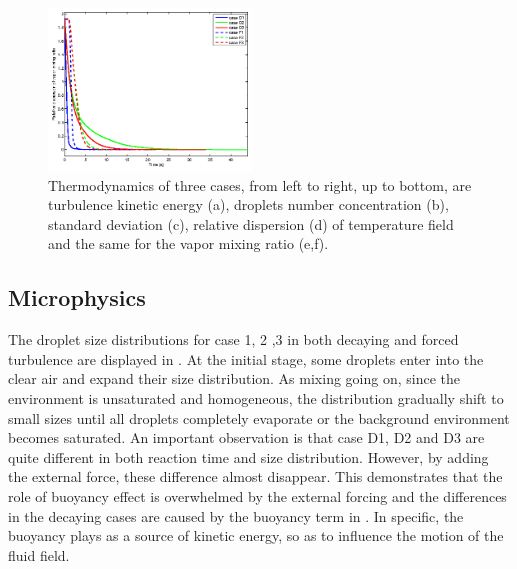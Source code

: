 \begin{figure}
\includegraphics[width=0.48\textwidth]{Figures/vapor_dsp}
\caption{Thermodynamics of three cases, from left to right, up to bottom, are
turbulence kinetic energy (a), droplets number concentration (b), standard
deviation (c), relative dispersion (d) of temperature field and the same for
the vapor mixing ratio (e,f).\label{fig:therm_dynam}} \end{figure}

\subsection{Microphysics}
The droplet size distributions for case 1, 2 ,3 in both decaying and forced
turbulence are displayed in . At the initial stage, some
droplets enter into the clear air and expand their size distribution. As mixing
going on, since the environment is unsaturated and homogeneous, the
distribution gradually shift to small sizes until all droplets completely
evaporate or the background environment becomes saturated.  An important
observation is that case D1, D2 and D3 are quite different in both reaction
time and size distribution. However, by adding the external force, these
difference almost disappear. This demonstrates that the role of buoyancy effect
is overwhelmed by the external forcing and the differences in the decaying
cases are caused by the buoyancy term in . In specific, the
buoyancy plays as a source of kinetic energy, so as to influence the motion of
the fluid field.  

